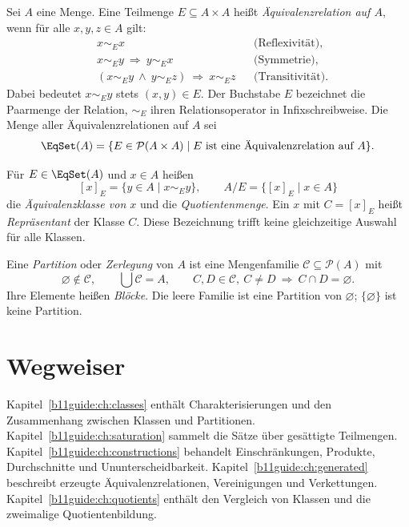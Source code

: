 \begin{definition}[Äquivalenzrelation]\label{b11guide:def:equivalence}
Sei $A$ eine Menge. Eine Teilmenge $E\subseteq A\times A$
heißt \emph{Äquivalenzrelation auf $A$}, wenn für alle $x,y,z\in A$
gilt:
\[
\begin{aligned}
 &x\sim_E x &&\text{(Reflexivität)},\\
 &x\sim_E y\ \Rightarrow\ y\sim_E x &&\text{(Symmetrie)},\\
 &(x\sim_E y\ \land\ y\sim_E z)\ \Rightarrow\ x\sim_E z
 &&\text{(Transitivität)}.
\end{aligned}
\]
Dabei bedeutet $x\sim_E y$ stets $(x,y)\in E$.
Der Buchstabe $E$ bezeichnet die Paarmenge der Relation,
$\sim_E$ ihren Relationsoperator in Infixschreibweise.
Die Menge aller Äquivalenzrelationen auf $A$ sei
\[
 \EqSet(A)=\{E\in\mathcal P(A\times A)\mid
                       E\text{ ist eine Äquivalenzrelation auf }A\}.
\]
\end{definition}

\begin{definition}
\label{b11guide:def:class}
Für $E\in\EqSet(A)$ und $x\in A$ heißen
\[
 [x]_E=\{y\in A\mid x\sim_E y\},
 \qquad A/E=\{[x]_E\mid x\in A\}
\]
die \emph{Äquivalenzklasse von $x$} und die \emph{Quotientenmenge}.
Ein $x$ mit $C=[x]_E$ heißt \emph{Repräsentant} der Klasse $C$.
Diese Bezeichnung trifft keine gleichzeitige Auswahl für alle Klassen.
\end{definition}

\begin{definition}[Partition]\label{b11guide:def:partition}
Eine \emph{Partition} oder \emph{Zerlegung} von $A$ ist eine
Mengenfamilie $\mathcal C\subseteq\mathcal P(A)$ mit
\[
 \varnothing\notin\mathcal C,\qquad
 \bigcup\mathcal C=A,\qquad
 C,D\in\mathcal C,\ C\ne D\ \Rightarrow\ C\cap D=\varnothing.
\]
Ihre Elemente heißen \emph{Blöcke}. Die leere Familie ist eine
Partition von $\varnothing$; $\{\varnothing\}$ ist keine Partition.
\end{definition}

\section{Wegweiser}

Kapitel~\ref{b11guide:ch:classes} enthält Charakterisierungen und
den Zusammenhang zwischen Klassen und Partitionen.
Kapitel~\ref{b11guide:ch:saturation} sammelt die Sätze über
gesättigte Teilmengen.
Kapitel~\ref{b11guide:ch:constructions} behandelt Einschränkungen,
Produkte, Durchschnitte und Ununterscheidbarkeit.
Kapitel~\ref{b11guide:ch:generated} beschreibt erzeugte
Äquivalenzrelationen, Vereinigungen und Verkettungen.
Kapitel~\ref{b11guide:ch:quotients} enthält den Vergleich von
Klassen und die zweimalige Quotientenbildung.

